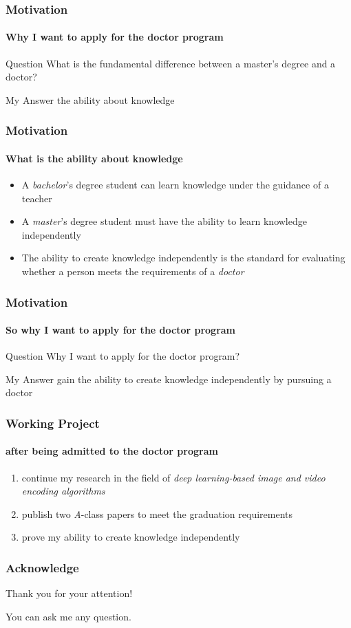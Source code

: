 \documentclass[aspectratio=169]{beamer}
\begin{document}
\begin{frame}
  \frametitle{Motivation}
  \framesubtitle{Why I want to apply for the doctor program}
  \begin{block}{Question}
    What is the fundamental difference between a master's degree and a doctor?
  \end{block}
  \pause%
  \begin{block}{My Answer}
    the ability about \alert{knowledge}
  \end{block}
\end{frame}

\begin{frame}
  \frametitle{Motivation}
  \framesubtitle{What is the ability about \alert{knowledge}}
  \begin{itemize}[<+->]
    \item A \emph{bachelor}'s degree student can \alert{learn knowledge under
            the guidance of a teacher}
    \item A \emph{master}'s degree student must have the ability to \alert{learn
            knowledge independently}
    \item The ability to \alert{create knowledge independently} is the standard
          for evaluating whether a person meets the requirements of a \emph{doctor}
  \end{itemize}
\end{frame}

\begin{frame}
  \frametitle{Motivation}
  \framesubtitle{So why I want to apply for the doctor program}
  \begin{block}{Question}
    Why I want to apply for the doctor program?
  \end{block}
  \pause%
  \begin{block}{My Answer}
    gain the ability to \alert{create knowledge independently} by pursuing a
    doctor
  \end{block}
\end{frame}

\begin{frame}
  \frametitle{Working Project}
  \framesubtitle{after being admitted to the doctor program}
  \begin{enumerate}
    \item continue my research in the field of \emph{deep learning-based image
            and video encoding algorithms}
    \item publish two \emph{A}-class papers to meet the graduation requirements
    \item prove my ability to \alert{create knowledge independently}
  \end{enumerate}
\end{frame}

\begin{frame}
  \frametitle{Acknowledge}
  Thank you for your attention!

  You can ask me any question.
\end{frame}
\end{document}
